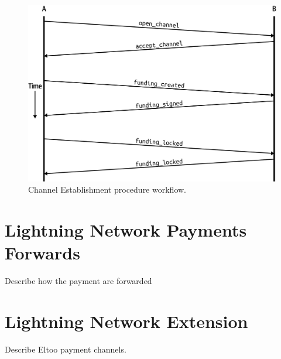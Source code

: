 \begin{figure}[h]
  \begin{center}
  \includegraphics[width=0.6\columnwidth]{imgs/mtln_0703.png}
  \end{center}
  \caption{Channel Establishment procedure workflow.}
  \label{fig:channel-establishment}
\end{figure}

\section{Lightning Network Payments Forwards}
\label{sec:payment_forwarding}

Describe how the payment are forwarded

\section{Lightning Network Extension}

Describe Eltoo\cite{eltoo} payment channels.
